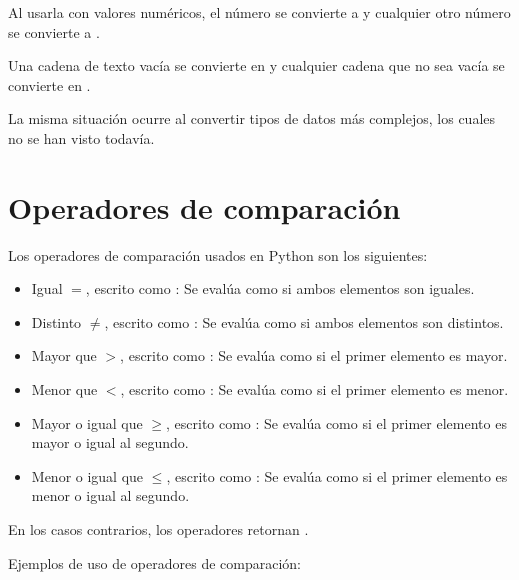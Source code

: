Al usarla con valores numéricos, el número  se convierte a  y cualquier otro número se convierte a .


Una cadena de texto vacía se convierte en  y cualquier cadena que no sea vacía se convierte en .


La misma situación ocurre al convertir tipos de datos más complejos, los cuales no se han visto todavía.


\section{Operadores de comparación}

Los operadores de comparación usados en Python son los siguientes:

\begin{itemize}
  \item Igual $=$, escrito como \ttt{==}: Se evalúa como  si ambos elementos son iguales.
  
  \item Distinto $\neq$, escrito como \ttt{!=}: Se evalúa como  si ambos elementos son distintos.
  
  \item Mayor que $>$, escrito como \ttt{>}: Se evalúa como  si el primer elemento es mayor.
  
  \item Menor que $<$, escrito como \ttt{<}: Se evalúa como  si el primer elemento es menor.
  
  \item Mayor o igual que $\geq$, escrito como \ttt{>=}: Se evalúa como  si el primer elemento es mayor o igual al segundo.
  
  \item Menor o igual que $\leq$, escrito como \ttt{<=}: Se evalúa como  si el primer elemento es menor o igual al segundo.
  
\end{itemize}

En los casos contrarios, los operadores retornan .\smallskip

Ejemplos de uso de operadores de comparación:

